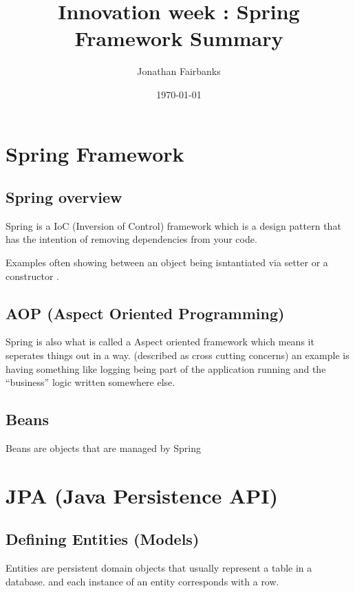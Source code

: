 \documentclass[11pt]{article}
\author{Jonathan Fairbanks}
\date{\today}
\title{Innovation week : Spring Framework Summary}
\begin{document}
\maketitle
\tableofcontents



\section{Spring Framework}
\label{sec:org4744956}
\subsection{Spring overview}
\label{sec:org3066e04}
Spring is a IoC (Inversion of Control) framework which is a design pattern that has the intention of removing dependencies from your code.

Examples often showing between an object being isntantiated via setter or a constructor .
\subsection{AOP (Aspect Oriented Programming)}
\label{sec:org09b0114}
Spring is also what is called a Aspect oriented framework which means it seperates things out in a way. (described as cross cutting concerns) an example is having something like logging being part of the application running and the ``business'' logic written somewhere else.
\subsection{Beans}
\label{sec:org754b062}
Beans are objects that are managed by Spring
\section{JPA (Java Persistence API)}
\label{sec:orge7c462d}
\subsection{Defining Entities (Models)}
\label{sec:orgba195e6}
Entities are persistent domain objects that usually represent a table in a database. and each instance of an entity corresponds with a row.
\end{document}
